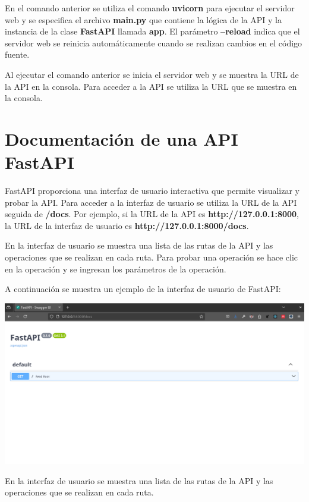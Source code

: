 \documentclass[
  a4paper,
  DIV=11,
  numbers=noendperiod,
  onepage,
  openany]{scrreprt}
\begin{document}
En el comando anterior se utiliza el comando \textbf{uvicorn} para
ejecutar el servidor web y se especifica el archivo \textbf{main.py} que
contiene la lógica de la API y la instancia de la clase \textbf{FastAPI}
llamada \textbf{app}. El parámetro \textbf{--reload} indica que el
servidor web se reinicia automáticamente cuando se realizan cambios en
el código fuente.

Al ejecutar el comando anterior se inicia el servidor web y se muestra
la URL de la API en la consola. Para acceder a la API se utiliza la URL
que se muestra en la consola.

\section{Documentación de una API
FastAPI}\label{documentaciuxf3n-de-una-api-fastapi}

FastAPI proporciona una interfaz de usuario interactiva que permite
visualizar y probar la API. Para acceder a la interfaz de usuario se
utiliza la URL de la API seguida de \textbf{/docs}. Por ejemplo, si la
URL de la API es \textbf{http://127.0.0.1:8000}, la URL de la interfaz
de usuario es \textbf{http://127.0.0.1:8000/docs}.

En la interfaz de usuario se muestra una lista de las rutas de la API y
las operaciones que se realizan en cada ruta. Para probar una operación
se hace clic en la operación y se ingresan los parámetros de la
operación.

A continuación se muestra un ejemplo de la interfaz de usuario de
FastAPI:

\includegraphics{unidades/unidad5/images/paste-18.png}

En la interfaz de usuario se muestra una lista de las rutas de la API y
las operaciones que se realizan en cada ruta.
\end{document}

